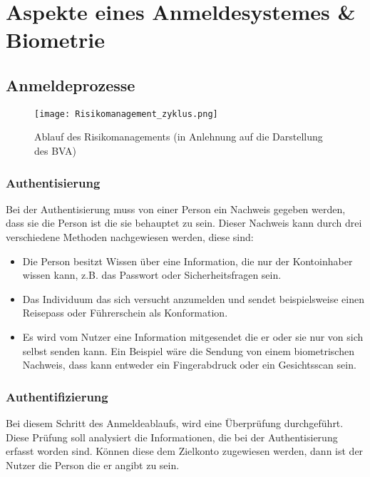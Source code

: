 \chapter{Aspekte eines Anmeldesystemes & Biometrie}

\section{Anmeldeprozesse}
\begin{center}
\begin{figure}[h]
    \centering
    \texttt{[image: Risikomanagement\_zyklus.png]}
    \caption{Ablauf des Risikomanagements (in Anlehnung auf die Darstellung des BVA)}
\end{figure}
\end{center}

\subsection{Authentisierung}
Bei der Authentisierung muss von einer Person ein Nachweis gegeben werden, dass sie die Person ist die sie behauptet zu sein. Dieser Nachweis kann durch drei verschiedene Methoden nachgewiesen werden, diese sind:
\begin{itemize}
	\item Die Person besitzt Wissen über eine Information, die nur der Kontoinhaber wissen kann, z.B. das Passwort oder Sicherheitsfragen sein.
	\item Das Individuum das sich versucht anzumelden und sendet beispielsweise einen Reisepass oder Führerschein als Konformation.
	\item Es wird vom Nutzer eine Information mitgesendet die er oder sie nur von sich selbst senden kann. Ein Beispiel wäre die Sendung von einem biometrischen Nachweis, dass kann entweder ein Fingerabdruck oder ein Gesichtsscan sein.
\end{itemize}

\subsection{Authentifizierung}
Bei diesem Schritt des Anmeldeablaufs, wird eine Überprüfung durchgeführt. Diese Prüfung soll analysiert die Informationen, die bei der Authentisierung erfasst worden sind. Können diese dem Zielkonto zugewiesen werden, dann ist der Nutzer die Person die er angibt zu sein.


